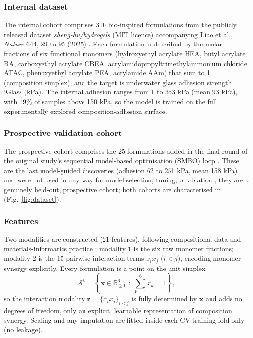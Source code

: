 \documentclass[utf8]{FrontiersinHarvard}
\newcommand{\Fref}[2]{Fig.~\hyperref[#1]{\ref{#1}#2}}
\begin{document}
\subsubsection{Internal dataset}
The internal cohort comprises 316 bio-inspired formulations from the publicly released dataset \emph{sheng-hu/hydrogels} (MIT licence) accompanying Liao et al., \textit{Nature} 644, 89 to 95 (2025) \cite{liao2025nature}. Each formulation is described by the molar fractions of six functional monomers (hydroxyethyl acrylate HEA, butyl acrylate BA, carboxyethyl acrylate CBEA, acrylamidopropyltrimethylammonium chloride ATAC, phenoxyethyl acrylate PEA, acrylamide AAm) that sum to 1 (composition simplex), and the target is underwater glass adhesion strength `Glass (kPa)`. The internal adhesion ranges from 1 to 353 kPa (mean 93 kPa), with 19\% of samples above 150 kPa, so the model is trained on the full experimentally explored composition-adhesion surface.

\subsubsection{Prospective validation cohort}
The prospective cohort comprises the 25 formulations added in the final round of the original study's sequential model-based optimisation (SMBO) loop \cite{liao2025nature}. These are the last model-guided discoveries (adhesion 62 to 251 kPa, mean 158 kPa) and were not used in any way for model selection, tuning, or ablation \cite{tibshirani1996lasso}; they are a genuinely held-out, prospective cohort; both cohorts are characterised in (\Fref{fig:dataset}{}).

\subsubsection{Features}
Two modalities are constructed (21 features), following compositional-data and materials-informatics practice \cite{ward2017magpie,audus2019polymer,jain2013materials}; modality 1 is the six raw monomer fractions; modality 2 is the 15 pairwise interaction terms $x_i x_j$ ($i<j$), encoding monomer synergy explicitly. Every formulation is a point on the unit simplex
\begin{equation}
\mathcal{S}^5 = \left\{ \mathbf{x} \in \mathbb{R}^6_{\ge 0} \;:\; \sum_{k=1}^{6} x_k = 1 \right\},
\label{eq:simplex}
\end{equation}
so the interaction modality $\mathbf{z} = \{x_i x_j\}_{i<j}$ is fully determined by $\mathbf{x}$ and adds no degrees of freedom, only an explicit, learnable representation of composition synergy. Scaling and any imputation are fitted inside each CV training fold only (no leakage).
\end{document}
